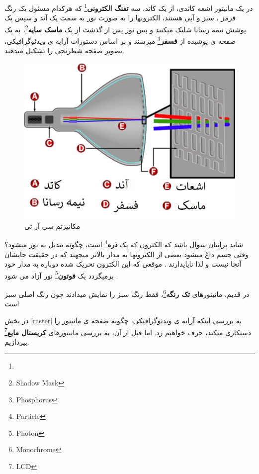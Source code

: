 \documentclass[14pt,a4paper]{memoir}
\begin{document}
	 در یک مانیتور اشعه کاتدی، از یک کاتد، سه \textbf{تفنگ الکترونی}\footnote{} که هرکدام مسئول یک رنگ قرمز ، سبز و آبی هستند، الکترونها را به صورت نور به سمت یک آند و سپس یک پوشش نیمه رسانا شلیک میکنند و پس نور پس از گذشت از یک \textbf{ماسک سایه}\footnote{Shadow Mask}، به یک صفحه ی پوشیده از \textbf{فسفر}\footnote{Phosphorus}  میرسند و بر اساس دستورات آرایه ی ویدئوگرافیکی، تصویر صفحه شطرنجی را تشکیل میدهند.
	 
	 
	 
	 \begin{figure}[H]
	 	\centering
	 	\includegraphics[scale=0.5]{CRT}
	 	\caption{مکانیزتم سی آر تی}
	 \end{figure}
	 
	 
	 \begin{tip}
	 	شاید برایتان سوال باشد که الکترون که یک \textbf{ذره}\footnote{Particle} است، چگونه تبدیل به نور میشود؟ وقتی جسم داغ میشود بعضی از الکترونها به مدار بالاتر میجهند که در حقیقت جایشان آنجا نیست و لذا ناپایدارند . موقعی که این الکترون تحریک شده دوباره به مدار خود برمیگردد یک \textbf{فوتون}\footnote{Photon} نور آزاد می شود .
	 \end{tip}
	 
	 \begin{tip}
	 	در قدیم، مانیتورهای \textbf{تک رنگه}\footnote{Monochrome}، فقط رنگ سبز را نمایش میدادند چون رنگ اصلی  سبز است
	 \end{tip}
	 
	 
	 در بخش \ref{raster} به بررسی اینکه آرایه ی ویدئوگرافیکی، چگونه صفحه ی مانیتور را دستکاری میکند، حرف خواهیم زد. اما قبل از آن، به بررسی مانیتورهای \textbf{کریستال مایع}\footnote{LCD} بپردازیم.
	 
\end{document}
